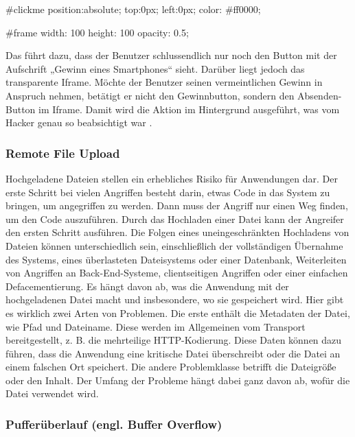 \begin{LaTeXCode}[caption={CSS},captionpos=b, label=LaTeXCode:cj3][numbers=none]
#clickme {
	position:absolute;
	top:0px;
	left:0px;
	color: #ff0000;
}

#frame {
	width: 100%
	height: 100%
	opacity: 0.5;
}
\end{LaTeXCode}

Das führt dazu, dass der Benutzer schlussendlich nur noch den Button mit der Aufschrift „Gewinn eines Smartphones“ sieht. Darüber liegt jedoch das transparente Iframe. Möchte der Benutzer seinen vermeintlichen Gewinn in Anspruch nehmen, betätigt er nicht den Gewinnbutton, sondern den Absenden-Button im Iframe. Damit wird die Aktion im Hintergrund ausgeführt, was vom Hacker genau so beabsichtigt war \cite{cjd13}.\\

\subsubsection{Remote File Upload}

Hochgeladene Dateien stellen ein erhebliches Risiko für Anwendungen dar. Der erste Schritt bei vielen Angriffen besteht darin, etwas Code in das System zu bringen, um angegriffen zu werden. Dann muss der Angriff nur einen Weg finden, um den Code auszuführen. Durch das Hochladen einer Datei kann der Angreifer den ersten Schritt ausführen. Die Folgen eines uneingeschränkten Hochladens von Dateien können unterschiedlich sein, einschließlich der vollständigen Übernahme des Systems, eines überlasteten Dateisystems oder einer Datenbank, Weiterleiten von Angriffen an Back-End-Systeme, clientseitigen Angriffen oder einer einfachen Defacementierung. Es hängt davon ab, was die Anwendung mit der hochgeladenen Datei macht und insbesondere, wo sie gespeichert wird. Hier gibt es wirklich zwei Arten von Problemen. Die erste enthält die Metadaten der Datei, wie Pfad und Dateiname. Diese werden im Allgemeinen vom Transport bereitgestellt, z. B. die mehrteilige HTTP-Kodierung. Diese Daten können dazu führen, dass die Anwendung eine kritische Datei überschreibt oder die Datei an einem falschen Ort speichert. Die andere Problemklasse betrifft die Dateigröße oder den Inhalt. Der Umfang der Probleme hängt dabei ganz davon ab, wofür die Datei verwendet wird\cite{fileremotevul18}. \\

\subsubsection{Pufferüberlauf (engl. Buffer Overflow)}

